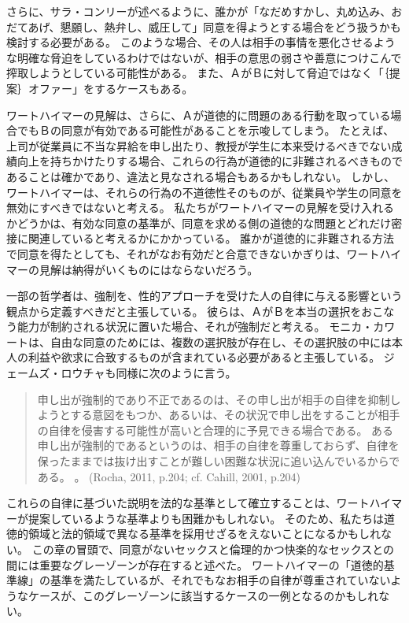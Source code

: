 \documentclass[paper=a4,book,openany]{jlreq}
\newcommand{\ig}[1]{}           %
\begin{document}
さらに、サラ・コンリーが述べるように、誰かが「なだめすかし、丸め込み、おだてあげ、懇願し、熱弁し、威圧して」同意を得ようとする場合をどう扱うかも検討する必要がある\citep[p.115]{conly04:seductionrapecoercion}。
このような場合、その人は相手の事情を悪化させるような明確な脅迫をしているわけではないが、相手の意思の弱さや善意につけこんで搾取しようとしている可能性がある。
また、ＡがＢに対して脅迫ではなく「｛提案｝{オファー}」をするケースもある。

ワートハイマーの見解は、さらに、Ａが道徳的に問題のある行動を取っている場合でもＢの同意が有効である可能性があることを示唆してしまう。
たとえば、上司が従業員に不当な昇給を申し出たり、教授が学生に本来受けるべきでない成績向上を持ちかけたりする場合、これらの行為が道徳的に非難されるべきものであることは確かであり、違法と見なされる場合もあるかもしれない。
しかし、ワートハイマーは、それらの行為の不道徳性そのものが、従業員や学生の同意を無効にすべきではないと考える。
私たちがワートハイマーの見解を受け入れるかどうかは、有効な同意の基準が、同意を求める側の道徳的な問題とどれだけ密接に関連していると考えるかにかかっている。
誰かが道徳的に非難される方法で同意を得たとしても、それがなお有効だと合意できないかぎりは、ワートハイマーの見解は納得がいくものにはならないだろう。

一部の哲学者は、強制を、性的アプローチを受けた人の自律に与える影響という観点から定義すべきだと主張している。
彼らは、ＡがＢを本当の選択をおこなう能力が制約される状況に置いた場合、それが強制だと考える。
モニカ・カワート\ig{Monica Cowart}は、自由な同意のためには、複数の選択肢が存在し、その選択肢の中には本人の利益や欲求に合致するものが含まれている必要があると主張している\citep{cowart04:_under_acts_consen}。
ジェームズ・ロウチャ\ig{James Rocha}も同様に次のように言う。

\begin{quote}
申し出が強制的であり不正であるのは、その申し出が相手の自律を抑制しようとする意図をもつか、あるいは、その状況で申し出をすることが相手の自律を侵害する可能性が高いと合理的に予見できる場合である。
ある申し出が強制的であるというのは、相手の自律を尊重しておらず、自律を保ったままでは抜け出すことが難しい困難な状況に追い込んでいるからである。\nocite{rocha11:_sexual_haras_coerc_offer} \nocite{cahill01:_rethin_rape}。
(Rocha, 2011, p.204; cf. Cahill, 2001, p.204)

\end{quote}

これらの自律に基づいた説明を法的な基準として確立することは、ワートハイマーが提案しているような基準よりも困難かもしれない。
そのため、私たちは道徳的領域と法的領域で異なる基準を採用せざるをえないことになるかもしれない。
この章の冒頭で、同意がないセックスと倫理的かつ快楽的なセックスとの間には重要なグレーゾーンが存在すると述べた。
ワートハイマーの「道徳的基準線」の基準を満たしているが、それでもなお相手の自律が尊重されていないようなケースが、このグレーゾーンに該当するケースの一例となるのかもしれない。
\end{document}

